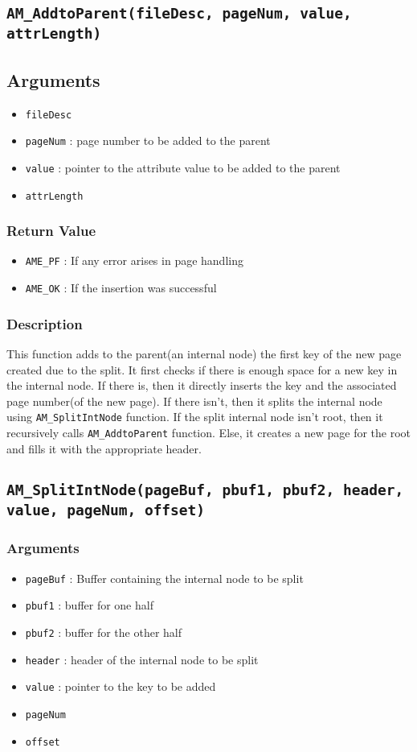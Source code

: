\documentclass[a4paper, 12pt]{article}
\begin{document}
\subsection{\texttt{AM\_AddtoParent(fileDesc, pageNum, value, attrLength)}}
\subsection{Arguments}
\begin{itemize}
	\item{\texttt{fileDesc}}
	\item{\texttt{pageNum} : page number to be added to the parent}
	\item{\texttt{value} : pointer to the attribute value to be added to the parent}
	\item{\texttt{attrLength}}
\end{itemize}
\subsubsection{Return Value}
\begin{itemize}
	\item{\texttt{AME\_PF} : If any error arises in page handling}
	\item{\texttt{AME\_OK} : If the insertion was successful}
\end{itemize}
\subsubsection{Description}
This function adds to the parent(an internal node) the first key of the new page created due to the split. It first checks if there is enough space for a new key in the internal node. If there is, then it directly inserts the key and the associated page number(of the new page). If there isn't, then it splits the internal node using \texttt{AM\_SplitIntNode} function. If the split internal node isn't root, then it recursively calls \texttt{AM\_AddtoParent} function. Else, it creates a new page for the root and fills it with the appropriate header.

\subsection{\texttt{AM\_SplitIntNode(pageBuf, pbuf1, pbuf2, header, value, pageNum, offset)}}
\subsubsection{Arguments}
\begin{itemize}
	\item{\texttt{pageBuf} : Buffer containing the internal node to be split}
	\item{\texttt{pbuf1} : buffer for one half}
	\item{\texttt{pbuf2} : buffer for the other half}
	\item{\texttt{header} : header of the internal node to be split}
	\item{\texttt{value} : pointer to the key to be added}
	\item{\texttt{pageNum}}
	\item{\texttt{offset}}
\end{itemize}
\end{document}
